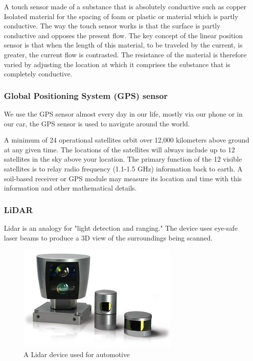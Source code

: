 A touch sensor made of a substance that is absolutely conductive such as copper Isolated material for the spacing of foam or plastic or material which is partly conductive.
The way the touch sensor works is that the surface is partly conductive and opposes the present flow. The key concept of the linear position sensor is that when the length of this material, to be traveled by the current, is greater, the current flow is contrasted. The resistance of the material is therefore varied by adjusting the location at which it comprises the substance that is completely conductive.

\subsubsection{Global Positioning System (GPS) sensor}

We use the GPS sensor almost every day in our life, mostly via our phone or in our car, the GPS sensor is used to navigate around the world.

A minimum of 24 operational satellites orbit over 12,000 kilometers above ground at any given time. The locations of the satellites will always include up to 12 satellites in the sky above your location. The primary function of the 12 visible satellites is to relay radio frequency (1.1-1.5 GHz) information back to earth. A soil-based receiver or GPS module may measure its location and time with this information and other mathematical details. \cite{misra2006globa}



\subsubsection{LiDAR}

Lidar is an analogy for "light detection and ranging." The device uses eye-safe laser beams to produce a 3D view of the surroundings being scanned.


\begin{figure}[h]
  \centering
    \includegraphics[width=0.5\linewidth]{figures/lidarSensor.jpg}
    \caption{A Lidar device used for automotive}
\label{fig:lidarSensor}
\end{figure}


